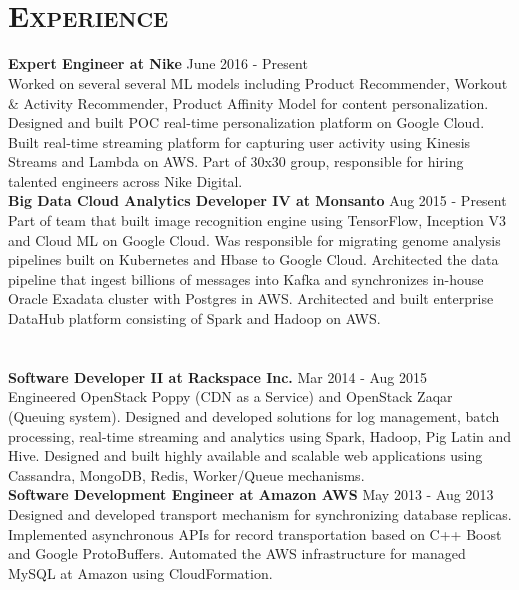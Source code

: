 \begin{resume}
\begin{formatb}
  \\
  \body\\
\end{formatb}

\section{\textsc{Experience}}
\textbf{Expert Engineer at Nike} \hfill June 2016 - Present\\
Worked on several several ML models including Product Recommender, Workout \& Activity Recommender, Product Affinity Model for content personalization. Designed and built POC real-time personalization platform on Google Cloud. Built real-time streaming platform for capturing user activity using Kinesis Streams and Lambda on AWS. Part of 30x30 group, responsible for hiring talented engineers across Nike Digital.\\
\textbf{Big Data Cloud Analytics Developer IV at Monsanto} \hfill Aug 2015 - Present\\
Part of team that built image recognition engine using TensorFlow, Inception V3 and Cloud ML on Google Cloud. Was responsible for migrating genome analysis pipelines built on Kubernetes and Hbase to Google Cloud. Architected the data pipeline that ingest billions of messages into Kafka and synchronizes in-house Oracle Exadata cluster with Postgres in AWS. Architected and built enterprise DataHub platform consisting of Spark and Hadoop on AWS.\\ \\ \\
\textbf{Software Developer II at Rackspace Inc.} \hfill Mar 2014 - Aug 2015\\
Engineered OpenStack Poppy (CDN as a Service) and OpenStack Zaqar (Queuing system). Designed and developed solutions for log management, batch processing, real-time streaming and analytics using Spark, Hadoop, Pig Latin and Hive. Designed and built highly available and scalable web applications using Cassandra, MongoDB, Redis, Worker/Queue mechanisms.\\
\textbf{Software Development Engineer at Amazon AWS} \hfill May 2013 - Aug 2013\\
Designed and developed transport mechanism for synchronizing database replicas. Implemented asynchronous APIs for record transportation based on C++ Boost and Google ProtoBuffers. Automated the AWS infrastructure for managed MySQL at Amazon using CloudFormation.\\

\end{resume}
